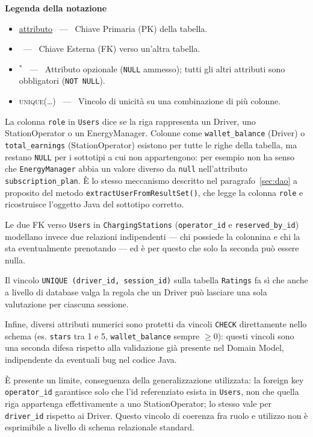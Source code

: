 \vspace{1em}
\noindent\textbf{Legenda della notazione}
\begin{itemize}
    \item[] \uline{attributo} \ — \ Chiave Primaria (PK) della tabella.
    \item[]  \ — \ Chiave Esterna (FK) verso un'altra tabella.
    \item[] $^{\ast}$ \ — \ Attributo opzionale (\texttt{NULL} ammesso); tutti gli altri attributi sono obbligatori (\texttt{NOT NULL}).
    \item[] \textsc{unique}(\dots) \ — \ Vincolo di unicità su una combinazione di più colonne.
\end{itemize}

La colonna \texttt{role} in \texttt{Users} dice se la riga rappresenta un Driver, uno StationOperator o un EnergyManager. Colonne come \texttt{wallet\_balance} (Driver) o \texttt{total\_earnings} (StationOperator) esistono per tutte le righe della tabella, ma restano \texttt{NULL} per i sottotipi a cui non appartengono: per esempio non ha senso che \texttt{EnergyManager} abbia un valore diverso da \texttt{null} nell'attributo \texttt{subscription\_plan}. È lo stesso meccanismo descritto nel paragrafo~\ref{sec:dao} a proposito del metodo \texttt{extractUserFromResultSet()}, che legge la colonna \texttt{role} e ricostruisce l'oggetto Java del sottotipo corretto.


Le due FK verso \texttt{Users} in \texttt{ChargingStations} (\texttt{operator\_id} e \texttt{reserved\_by\_id}) modellano invece due relazioni indipendenti — chi possiede la colonnina e chi la sta eventualmente prenotando — ed è per questo che solo la seconda può essere nulla.

Il vincolo \texttt{UNIQUE (driver\_id, session\_id)} sulla tabella \texttt{Ratings} fa sì che anche a livello di database valga la regola che un Driver può lasciare una sola valutazione per ciascuna sessione.

Infine, diversi attributi numerici sono protetti da vincoli \texttt{CHECK} direttamente nello schema (es. \texttt{stars} tra 1 e 5, \texttt{wallet\_balance} sempre $\geq 0$): questi vincoli sono una seconda difesa rispetto alla validazione già presente nel Domain Model, indipendente da eventuali bug nel codice Java.

È presente un limite, conseguenza della generalizzazione utilizzata: la foreign key \texttt{operator\_id} garantisce solo che l'id referenziato esista in \texttt{Users}, non che quella riga appartenga effettivamente a uno StationOperator; lo stesso vale per \texttt{driver\_id} rispetto ai Driver. Questo vincolo di coerenza fra ruolo e utilizzo non è esprimibile a livello di schema relazionale standard.

